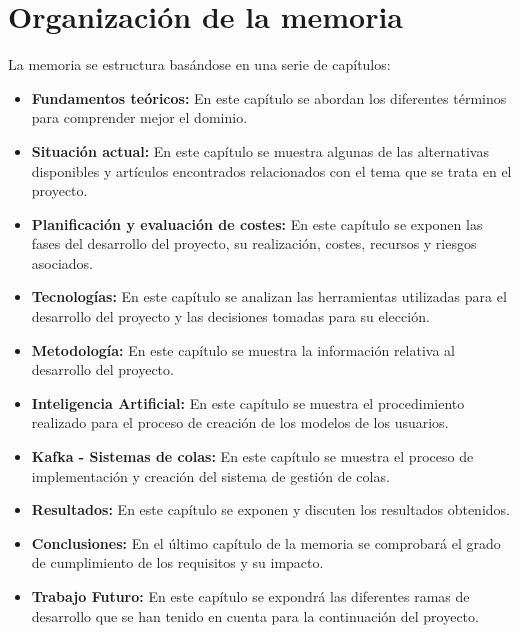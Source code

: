 \section{Organización de la memoria}
\label{sec:intro:organizacion}

La memoria se estructura basándose en una serie de capítulos:

\begin{itemize}[noitemsep]
    \item \textbf{Fundamentos teóricos:} En este capítulo se abordan los diferentes términos para comprender mejor el dominio.
    \item \textbf{Situación actual:} En este capítulo se muestra algunas de las alternativas disponibles y artículos encontrados relacionados con el tema que se trata en el proyecto.
    \item \textbf{Planificación y evaluación de costes:} En este capítulo se exponen las fases del desarrollo del proyecto, su realización, costes, recursos y riesgos asociados.
    \item \textbf{Tecnologías:} En este capítulo se analizan las herramientas utilizadas para el desarrollo del proyecto y las decisiones tomadas para su elección.
    \item \textbf{Metodología:} En este capítulo se muestra la información relativa al desarrollo del proyecto.
    \item \textbf{Inteligencia Artificial:} En este capítulo se muestra el procedimiento realizado para el proceso de creación de los modelos de los usuarios.
    \item \textbf{Kafka - Sistemas de colas:} En este capítulo se muestra el proceso de implementación y creación del sistema de gestión de colas.
    \item \textbf{Resultados:} En este capítulo se exponen y discuten los resultados obtenidos.
    \item \textbf{Conclusiones:} En el último capítulo de la memoria se comprobará el grado de cumplimiento de los requisitos y su impacto. 
    \item \textbf{Trabajo Futuro:} En este capítulo se expondrá las diferentes ramas de desarrollo que se han tenido en cuenta para la continuación del proyecto.
 
\end{itemize}
